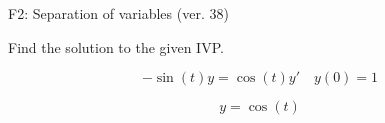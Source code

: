 \begin{exercise}
  \begin{exerciseTitle}F2: Separation of variables (ver. 38)\end{exerciseTitle}
  \begin{exerciseStatement}
    
Find the solution to the given IVP.

    
\[-\sin\left(t\right) y= \cos\left(t\right) y'\hspace{1em} y\left( 0 \right)= 1\]

  \end{exerciseStatement}
  \begin{exerciseAnswer}
    
\[y= \cos\left(t\right)\]

  \end{exerciseAnswer}
\end{exercise}